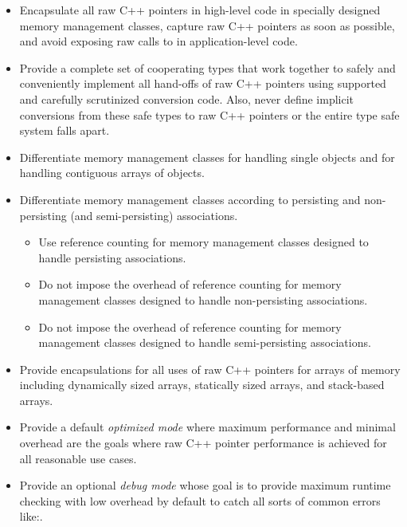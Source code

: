 \documentclass[pdf,ps2pdf,11pt]{SANDreport}
\begin{document}
\begin{itemize}

{}\item Encapsulate all raw C++ pointers in high-level code in
specially designed memory management classes, capture raw C++ pointers
as soon as possible, and avoid exposing raw calls to {} in
application-level code.

{}\item Provide a complete set of cooperating types that work together
to safely and conveniently implement all hand-offs of raw C++
pointers using supported and carefully scrutinized conversion code.
Also, never define implicit conversions from these safe types to raw
C++ pointers or the entire type safe system falls apart.

{}\item Differentiate memory management classes for handling single
objects and for handling contiguous arrays of objects.

{}\item Differentiate memory management classes according to
persisting and non-persisting (and semi-persisting) associations.

  \begin{itemize}

  {}\item Use reference counting for memory management classes
  designed to handle persisting associations.

  {}\item Do not impose the overhead of reference counting for memory
  management classes designed to handle non-persisting associations.

  {}\item Do not impose the overhead of reference counting for memory
  management classes designed to handle semi-persisting associations.

  \end{itemize}

{}\item Provide encapsulations for all uses of raw C++ pointers for
arrays of memory including dynamically sized arrays, statically sized
arrays, and stack-based arrays.

{}\item Provide a default {}\textit{optimized mode} where maximum
performance and minimal overhead are the goals where raw C++ pointer
performance is achieved for all reasonable use cases.

{}\item Provide an optional {}\textit{debug mode} whose goal is to
provide maximum runtime checking with low overhead by default to catch
all sorts of common errors like:.


\end{itemize}
\end{document}
